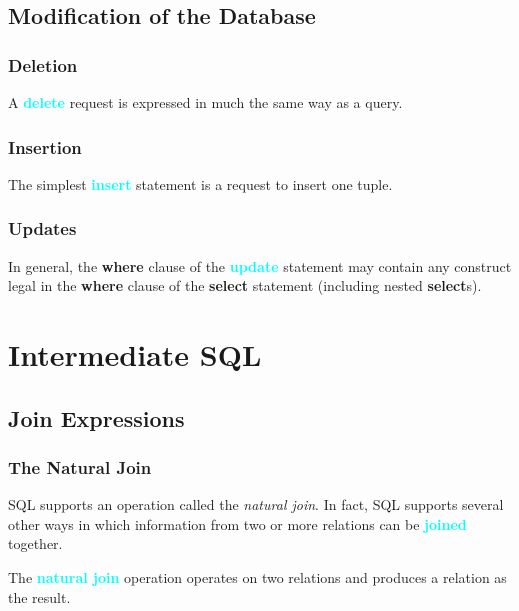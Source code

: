 \documentclass{Beautybook-EN}
\newcommand{\textcy}[1]{\textbf{\textcolor{cyan}{#1}}}
\begin{document}
\section{Modification of the Database}
\subsection{Deletion}

A \textcy{delete} request is expressed in much the same way as a query.

\subsection{Insertion}

The simplest \textcy{insert} statement is a request to insert one tuple.

\subsection{Updates}

In general, the \textbf{where} clause of the \textcy{update} statement may contain any construct legal in the \textbf{where} clause of the \textbf{select} statement (including nested \textbf{select}s).

\chapter{Intermediate SQL}
\section{Join Expressions}
\subsection{The Natural Join}

SQL supports an operation called the \textit{natural join}. In fact, SQL supports several other ways in which information from two or more relations can be \textcy{joined} together.

The \textcy{natural join} operation operates on two relations and produces a relation as the result.

{ %
\normalem
\thispagestyle{empty}}
\makebottomcover
\end{document}
